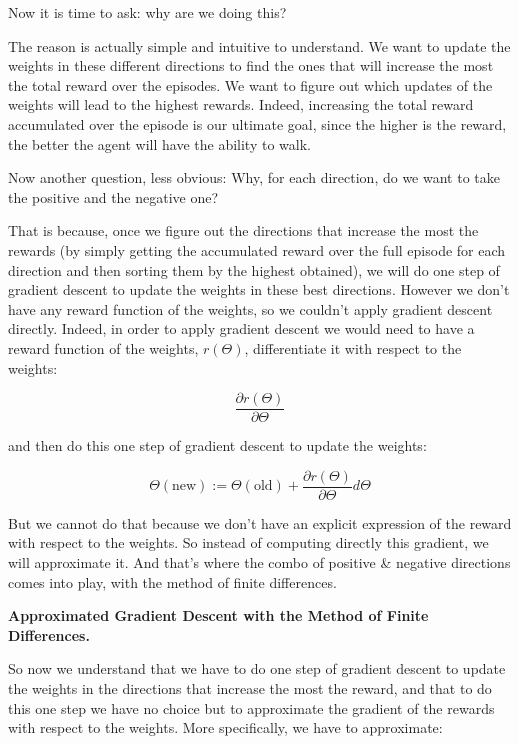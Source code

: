 \documentclass[]{book}
\begin{document}
Now it is time to ask: why are we doing this?

The reason is actually simple and intuitive to understand. We want to update the weights in these different directions to find the ones that will increase the most the total reward over the episodes. We want to figure out which updates of the weights will lead to the highest rewards. Indeed, increasing the total reward accumulated over the episode is our ultimate goal, since the higher is the reward, the better the agent will have the ability to walk.

Now another question, less obvious: Why, for each direction, do we want to take the positive and the negative one?

That is because, once we figure out the directions that increase the most the rewards (by simply getting the accumulated reward over the full episode for each direction and then sorting them by the highest obtained), we will do one step of gradient descent to update the weights in these best directions. However we don't have any reward function of the weights, so we couldn't apply gradient descent directly. Indeed, in order to apply gradient descent we would need to have a reward function of the weights, \(r(\Theta)\), differentiate it with respect to the weights:

\begin{equation*}
\frac{\partial r(\Theta)}{\partial \Theta}
\end{equation*}

and then do this one step of gradient descent to update the weights:

\begin{equation*}
\Theta(\textrm{new}) := \Theta(\textrm{old}) + \frac{\partial r(\Theta)}{\partial \Theta} d \Theta
\end{equation*}

But we cannot do that because we don't have an explicit expression of the reward with respect to the weights. So instead of computing directly this gradient, we will approximate it. And that's where the combo of positive \& negative directions comes into play, with the method of finite differences.

\textbf{Approximated Gradient Descent with the Method of Finite Differences.}

So now we understand that we have to do one step of gradient descent to update the weights in the directions that increase the most the reward, and that to do this one step we have no choice but to approximate the gradient of the rewards with respect to the weights. More specifically, we have to approximate:
\end{document}
